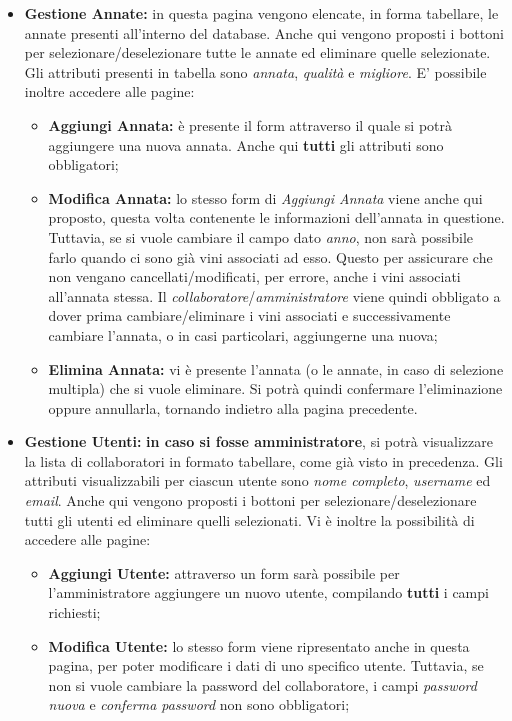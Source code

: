 \begin{itemize}
	\item \textbf{Gestione Annate:} in questa pagina vengono elencate, in forma tabellare, le annate presenti all'interno del database. Anche qui vengono proposti i bottoni per selezionare/deselezionare tutte le annate ed eliminare quelle selezionate. Gli attributi presenti in tabella sono \textit{annata}, \textit{qualità} e \textit{migliore}. E' possibile inoltre accedere alle pagine:
		\begin{itemize}
			\item \textbf{Aggiungi Annata:} è presente il form attraverso il quale si potrà aggiungere una nuova annata. Anche qui \textbf{tutti} gli attributi sono obbligatori;
			\item \textbf{Modifica Annata:} lo stesso form di \textit{Aggiungi Annata} viene anche qui proposto, questa volta contenente le informazioni dell'annata in questione. Tuttavia, se si vuole cambiare il campo dato \textit{anno}, non sarà possibile farlo quando ci sono già vini associati ad esso. Questo per assicurare che non vengano cancellati/modificati, per errore, anche i vini associati all'annata stessa. Il \textit{collaboratore}/\textit{amministratore} viene quindi obbligato a dover prima cambiare/eliminare i vini associati e successivamente cambiare l'annata, o in casi particolari, aggiungerne una nuova;
			\item \textbf{Elimina Annata:} vi è presente l'annata (o le annate, in caso di selezione multipla) che si vuole eliminare. Si potrà quindi confermare l'eliminazione oppure annullarla, tornando indietro alla pagina precedente.
		\end{itemize}
	\item \textbf{Gestione Utenti:} \textbf{in caso si fosse amministratore}, si potrà visualizzare la lista di collaboratori in formato tabellare, come già visto in precedenza. Gli attributi visualizzabili per ciascun utente sono \textit{nome completo}, \textit{username} ed \textit{email}. Anche qui vengono proposti i bottoni per selezionare/deselezionare tutti gli utenti ed eliminare quelli selezionati. Vi è inoltre la possibilità di accedere alle pagine:
		\begin{itemize}
			\item \textbf{Aggiungi Utente:} attraverso un form sarà possibile per l'amministratore aggiungere un nuovo utente, compilando \textbf{tutti} i campi richiesti;
			\item \textbf{Modifica Utente:} lo stesso form viene ripresentato anche in questa pagina, per poter modificare i dati di uno specifico utente. Tuttavia, se non si vuole cambiare la password del collaboratore, i campi \textit{password nuova} e \textit{conferma password} non sono obbligatori;

\end{itemize}
\end{itemize}
